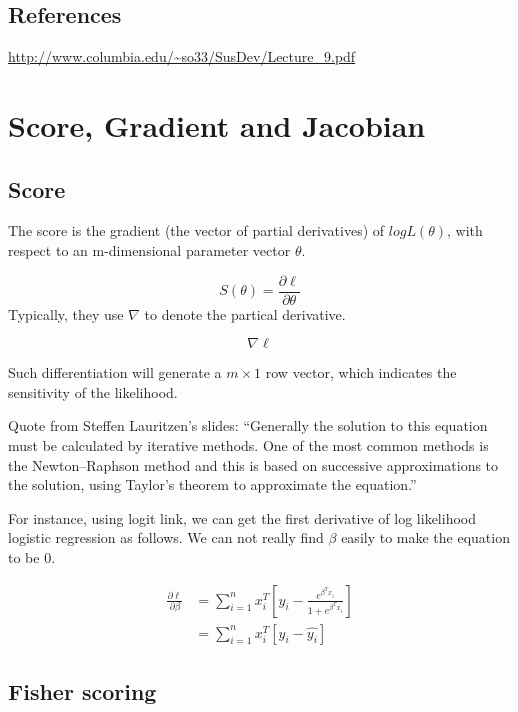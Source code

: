 \documentclass[]{book}
\begin{document}
\hypertarget{references}{%
\section{References}\label{references}}

\url{http://www.columbia.edu/~so33/SusDev/Lecture_9.pdf}

\hypertarget{score-gradient-and-jacobian}{%
\chapter{Score, Gradient and Jacobian}\label{score-gradient-and-jacobian}}

\hypertarget{score}{%
\section{Score}\label{score}}

The score is the gradient (the vector of partial derivatives) of \(log L(\theta)\), with respect to an m-dimensional parameter vector \(\theta\).

\[S(\theta) = \frac{\partial\ell}{\partial \theta}\]
Typically, they use \(\nabla\) to denote the partical derivative.

\[\nabla \ell\]

Such differentiation will generate a \(m \times 1\) row vector, which indicates the sensitivity of the likelihood.

Quote from Steffen Lauritzen's slides: ``Generally the solution to this equation must be calculated by iterative methods. One of the most common methods is the Newton--Raphson
method and this is based on successive approximations to the solution, using Taylor's theorem to approximate the equation.''

For instance, using logit link, we can get the first derivative of log likelihood logistic regression as follows. We can not really find \(\beta\) easily to make the equation to be 0.

\[\begin{aligned}
\frac{\partial \ell} {\partial \beta} 
&= \sum_{i=1}^{n}x_i^T[y_i-\frac{e^{\beta^Tx_i}}{1+e^{\beta^Tx_i}}] \\
&=\sum_{i=1}^{n} x_i^T[y_i-\hat{y_i}]
\end{aligned}\]

\hypertarget{fisher-scoring}{%
\section{Fisher scoring}\label{fisher-scoring}}
\end{document}
